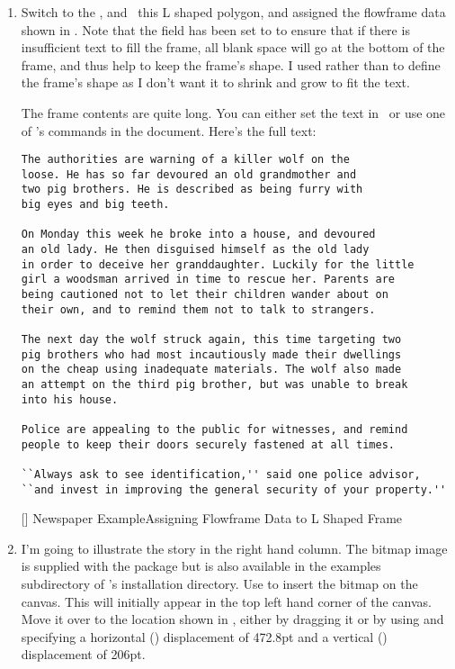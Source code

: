 \begin{enumerate}
[]
{}
{Newspaper Example\dash Added L Shaped Frame}

\item Switch to the , and
\select\ this L shaped polygon, and assigned the \gls{flowframe} data
shown in . Note that the
 field has been set to
 to ensure that if there is
insufficient text to fill the frame, all blank space will go at the
bottom of the frame, and thus help to keep the frame's shape. I
used  rather than
 to define the frame's shape
as I don't want it to shrink and grow to fit the text.

The frame contents are quite long. You can either set the text in
\FlowframTk\ or use one of 's commands in the
document. Here's the full text:
\begin{verbatim}
The authorities are warning of a killer wolf on the
loose. He has so far devoured an old grandmother and
two pig brothers. He is described as being furry with
big eyes and big teeth.

On Monday this week he broke into a house, and devoured
an old lady. He then disguised himself as the old lady
in order to deceive her granddaughter. Luckily for the little
girl a woodsman arrived in time to rescue her. Parents are
being cautioned not to let their children wander about on
their own, and to remind them not to talk to strangers.

The next day the wolf struck again, this time targeting two
pig brothers who had most incautiously made their dwellings
on the cheap using inadequate materials. The wolf also made
an attempt on the third pig brother, but was unable to break
into his house.

Police are appealing to the public for witnesses, and remind
people to keep their doors securely fastened at all times.

``Always ask to see identification,'' said one police advisor,
``and invest in improving the general security of your property.''
\end{verbatim}

[]
{}
{Newspaper Example\dash Assigning Flowframe Data to L Shaped
Frame}

\item I'm going to illustrate the story in the right hand column.
The \gls{bitmap} image  is supplied with the 
package but is also available in the examples subdirectory of
\FlowframTk's installation directory. Use 
to insert the \gls{bitmap} on the \gls{canvas}. This will initially
appear in the top left hand corner of the \gls{canvas}. Move it
over to the location shown in , either by
dragging it or by using  and specifying
a horizontal () displacement of 472.8pt
and a vertical () displacement of 206pt.


\end{enumerate}
